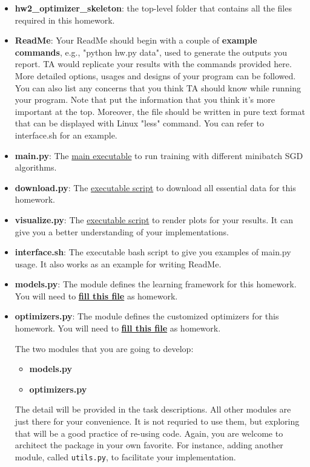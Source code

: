 \begin{itemize}
\item \textbf{hw2\_optimizer\_skeleton}: the top-level folder that contains all the files
          required in this homework.


\item \textbf{ReadMe}: Your ReadMe should begin with a couple of \textbf{example commands}, e.g., "python hw\homeworknumber.py data", used to generate the outputs you report. TA would replicate your results with the commands
          provided here. More detailed options, usages and designs of your
          program can be followed. You can also list any concerns that you
          think TA should know while running your program. Note that put the
          information that you think it's more important at the top. Moreover,
          the file should be written in pure text format that can be displayed
          with Linux "less" command.
          You can refer to interface.sh for an example.

\item \textbf{main.py}: The \underline{main executable} to run training with different minibatch SGD algorithms.
\item \textbf{download.py}: The \underline{executable script} to download all essential data for this homework.
\item \textbf{visualize.py}: The \underline{executable script} to render plots for your results.
          It can give you a better understanding of your implementations.

\item \textbf{interface.sh}: The executable bash script to give you examples of main.py usage. It also works as an example for writing ReadMe.

\item \textbf{models.py}: The module defines the learning framework for this homework.
    You will need to {\bf \underline{fill this file}} as homework.

\item \textbf{optimizers.py}: The module defines the customized optimizers for this homework.
        You will need to {\bf \underline{fill this file}} as homework.


The two modules that you are going to develop:
\begin{itemize}
\item \textbf{models.py}
\item \textbf{optimizers.py}
\end{itemize}
The detail will be provided in the task descriptions. All other modules are just there for your convenience. It is not requried to use them, but exploring that will be a good practice of re-using code. Again, you are welcome to architect the package in your own favorite. For instance, adding another module, called \texttt{utils.py}, to facilitate your implementation.

\end{itemize}


